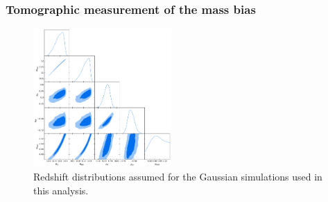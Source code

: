 \documentclass[useAMS,usenatbib]{mn2e}
\begin{document}
    \subsubsection{Tomographic measurement of the mass bias}\label{ssec:results.fid.1mb}
      \begin{figure}
        \centering
        \includegraphics[width=0.47\textwidth]{./figures/fiducial_wisc3.pdf}
        \caption{Redshift distributions assumed for the Gaussian simulations used in this analysis.}
        \label{fig:triangle}
      \end{figure}
\end{document}
